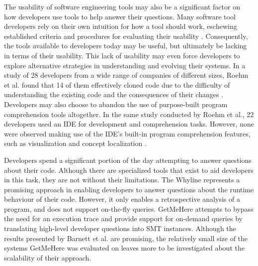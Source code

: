 \par The usability of software engineering tools may also be a significant
factor on how developers use tools to help answer their questions.
Many software tool developers rely on their own intuition for how a tool should
work, eschewing established criteria and procedures for evaluating their 
usability \cite{toleman-98-soft-tools}.
Consequently, the tools available to developers today may be useful, but
ultimately be lacking in terms of their usability.
This lack of usability may even force developers to explore alternative
strategies in understanding and evolving their systems.
In a study of 28 developers from a wide range of companies of different sizes,
Roehm et al. found that 14 of them effectively cloned code due to the
difficulty of understanding the existing code and the consequences of their
changes \cite{roehm-2012-comprehend-software}.
Developers may also choose to abandon the use of purpose-built program
comprehension tools altogether.
In the same study conducted by Roehm et al., 22 developers used an IDE
for development and comprehension tasks.
However, none were observed making use of the IDE's built-in program 
comprehension features, such as visualization and concept localization
\cite{roehm-2012-comprehend-software}.

\par Developers spend a significant portion of the day attempting to answer
questions about their code.
Although there are specialized tools that exist to aid developers in this task,
they are not without their limitations. 
The Whyline represents a promising approach in enabling developers to answer 
questions about the runtime behaviour of their code.
However, it only enables a retrospective analysis of a program, and does not 
support on-the-fly queries.
GetMeHere attempts to bypass the need for an execution trace and provide support
for on-demand queries by translating high-level developer questions into SMT
instances. 
Although the results presented by Barnett et al. are promising, the
relatively small size of the systems GetMeHere was evaluated on leaves more to
be investigated about the scalability of their approach.

\endinput

TODO: add a paragraph about what my thesis attempts to contribute (in relation
to the related work section).

